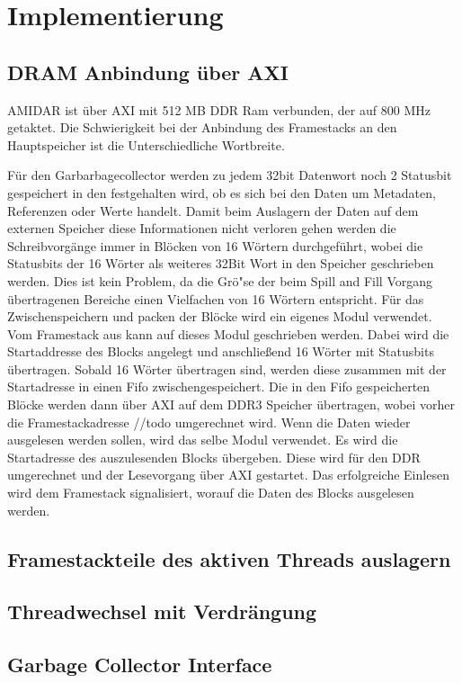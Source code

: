 \chapter{Implementierung}
\label{cha:Implementierung}
\section{DRAM Anbindung \"uber AXI}
AMIDAR ist \"uber AXI mit 512 MB DDR Ram verbunden, der auf 800 MHz getaktet.
Die Schwierigkeit bei der Anbindung des Framestacks an den Hauptspeicher ist die Unterschiedliche Wortbreite. 

F\"ur den Garbarbagecollector werden zu jedem 32bit Datenwort noch 2 Statusbit gespeichert in den festgehalten wird, ob es sich bei den Daten um Metadaten, Referenzen oder Werte handelt. Damit beim Auslagern der Daten auf dem externen Speicher diese Informationen nicht verloren gehen werden die Schreibvorg\"ange immer in Bl\"ocken von 16 W\"ortern durchgef\"uhrt, wobei die Statusbits der 16 W\"orter als weiteres 32Bit Wort in den Speicher geschrieben werden. Dies ist kein Problem, da die Gr\"o"se der beim Spill and Fill Vorgang \"ubertragenen Bereiche einen Vielfachen von 16 W\"ortern entspricht. 
F\"ur das Zwischenspeichern und packen der Bl\"ocke wird ein eigenes Modul verwendet.
Vom Framestack aus kann auf dieses Modul geschrieben werden. Dabei wird die Startaddresse des Blocks angelegt und anschließend 16 W\"orter mit Statusbits \"ubertragen. Sobald 16 W\"orter \"ubertragen sind, werden diese zusammen mit der Startadresse in einen Fifo zwischengespeichert. Die in den Fifo gespeicherten Bl\"ocke werden dann \"uber AXI auf dem DDR3 Speicher \"ubertragen, wobei vorher die Framestackadresse //todo umgerechnet wird. 
Wenn die Daten wieder ausgelesen werden sollen, wird das selbe Modul verwendet. Es wird die Startadresse des auszulesenden Blocks \"ubergeben. Diese wird f\"ur den DDR umgerechnet und der Lesevorgang \"uber AXI gestartet. Das erfolgreiche Einlesen wird dem Framestack signalisiert, worauf die Daten des Blocks ausgelesen werden. 

\section{Framestackteile des aktiven Threads auslagern}

\section{Threadwechsel mit Verdr\"angung}
\section{Garbage Collector Interface}